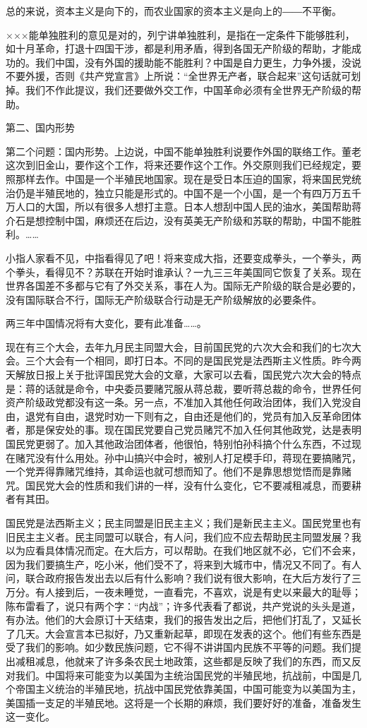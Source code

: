 总的来说，资本主义是向下的，而农业国家的资本主义是向上的――不平衡。

×××能单独胜利的意见是对的，列宁讲单独胜利，是指在一定条件下能够胜利，如十月革命，打退十四国干涉，都是利用矛盾，得到各国无产阶级的帮助，才能成功的。我们中国，没有外国的援助能不能胜利？中国是自力更生，力争外援，没说不要外援，否则《共产党宣言》上所说：“全世界无产者，联合起来”这句话就可划掉。我们不作此提议，我们还要做外交工作，中国革命必须有全世界无产阶级的帮助。

第二、国内形势

第二个问题：国内形势。上边说，中国不能单独胜利说要作外国的联络工作。董老这次到旧金山，要作这个工作，将来还要作这个工作。外交原则我们已经规定，要照那样去作。中国是一个半殖民地国家。现在是受日本压迫的国家，将来国民党统治仍是半殖民地的，独立只能是形式的。中国不是一个小国，是一个有四万万五千万人口的大国，所以有很多人想打主意。日本人想刮中国人民的油水，美国帮助蒋介石是想控制中国，麻烦还在后边，没有英美无产阶级和苏联的帮助，中国不能胜利。……

小指人家看不见，中指看得见了吧！将来变成大指，还要变成拳头，一个拳头，两个拳头，看得见不？苏联在开始时谁承认？一九三三年美国同它恢复了关系。现在世界各国差不多都与它有了外交关系，事在人为。国际无产阶级的联合是必要的，没有国际联合不行，国际无产阶级联合行动是无产阶级解放的必要条件。

两三年中国情况将有大变化，要有此准备……。

现在有三个大会，去年九月民主同盟大会，目前国民党的六次大会和我们的七次大会。三个大会有一个相同，即打日本。不同的是国民党是法西斯主义性质。昨今两天解放日报上关于批评国民党大会的文章，大家可以去看，国民党六次大会的特点是：蒋的话就是命令，中央委员要赌咒服从蒋总裁，要听蒋总裁的命令，世界任何资产阶级政党都没有这一条。另一点，不准加入其他任何政治团体，我们入党没自由，退党有自由，退党时劝一下则有之，自由还是他们的，党员有加入反革命团体者，那是保安处的事。现在国民党要自己党员赌咒不加入任何其他政党，达是表明国民党更弱了。加入其他政治团体者，他很怕，特别怕孙科搞个什么东西，不过现在赌咒没有什么用处。孙中山搞兴中会时，被别人打足模手印，蒋现在要搞赌咒，一个党弄得靠赌咒维持，其命运也就可想而知了。他们不是靠思想觉悟而是靠赌咒。国民党大会的性质和我们讲的一样，没有什么变化，它不要减租减息，而要耕者有其田。

国民党是法西斯主义；民主同盟是旧民主主义；我们是新民主主义。国民党里也有旧民主主义者。民主同盟可以联合，有人问，我们应不应去帮助民主同盟发展？我以为应看具体情况而定。在大后方，可以帮助。在我们地区就不必，它们不会来，因为我们要搞生产，吃小米，他们受不了，将来到大城市中，情况又不同了。有人问，联合政府报告发出去以后有什么影响？我们说有很大影响，在大后方发行了三万分。有人接到后，一夜未睡觉，一直看完，不喜欢，说是有史以来最大的耻辱；陈布雷看了，说只有两个字：“内战”；许多代表看了都说，共产党说的头头是道，有办法。他们的大会原订十天结束，我们的报告发出之后，把他们打乱了，又延长了几天。大会宣言本已拟好，乃又重新起草，即现在发表的这个。他们有些东西是受了我们的影响。如少数民族问题，它不得不讲讲国内民族不平等的问题。我们提出减租减息，他就来了许多条农民土地政策，这些都是反映了我们的东西，而又反对我们。中国将来可能变为以美国为主统治国民党的半殖民地，抗战前，中国是几个帝国主义统治的半殖民地，抗战中国民党依靠美国，中国可能变为以美国为主，美国插一支足的半殖民地。这将是一个长期的麻烦，我们要好好的准备，准备发生这一变化。


